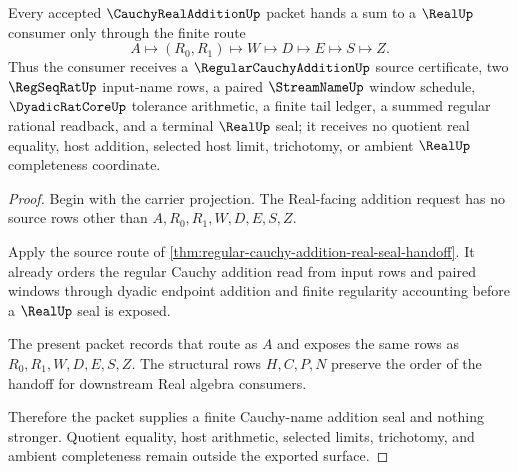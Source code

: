 \begin{theorem}
\label{thm:cauchy-real-addition-real-seal-handoff}
Every accepted $\CauchyRealAdditionUp$ packet hands a sum to a $\RealUp$ consumer only through the finite route
$$
A\longmapsto(R_0,R_1)\longmapsto W\longmapsto D\longmapsto E\longmapsto S\longmapsto Z .
$$
Thus the consumer receives a $\RegularCauchyAdditionUp$ source certificate, two $\RegSeqRatUp$ input-name rows, a paired $\StreamNameUp$ window schedule, $\DyadicRatCoreUp$ tolerance arithmetic, a finite tail ledger, a summed regular rational readback, and a terminal $\RealUp$ seal; it receives no quotient real equality, host addition, selected host limit, trichotomy, or ambient $\RealUp$ completeness coordinate.
\end{theorem}
\begin{proof}
Begin with the carrier projection. The Real-facing addition request has no source rows other than $A,R_0,R_1,W,D,E,S,Z$.

Apply the source route of \autoref{thm:regular-cauchy-addition-real-seal-handoff}. It already orders the regular Cauchy addition read from input rows and paired windows through dyadic endpoint addition and finite regularity accounting before a $\RealUp$ seal is exposed.

The present packet records that route as $A$ and exposes the same rows as $R_0,R_1,W,D,E,S,Z$. The structural rows $H,C,P,N$ preserve the order of the handoff for downstream Real algebra consumers.

Therefore the packet supplies a finite Cauchy-name addition seal and nothing stronger. Quotient equality, host arithmetic, selected limits, trichotomy, and ambient completeness remain outside the exported surface.
\end{proof}


